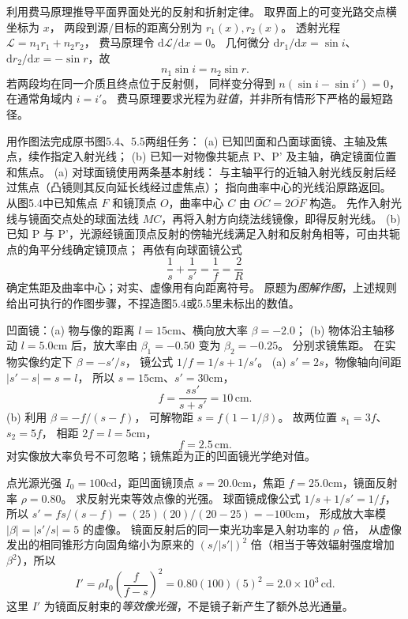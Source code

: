 利用费马原理推导平面界面处光的反射和折射定律。
\exsolution
取界面上的可变光路交点横坐标为 $x$，
两段到源/目标的距离分别为 $r_1(x),r_2(x)$。
透射光程
$\mathcal L=n_1r_1+n_2r_2$，
费马原理令
$\mathrm d\mathcal L/\mathrm dx=0$。
几何微分
$\mathrm dr_1/\mathrm dx=\sin i$、
$\mathrm dr_2/\mathrm dx=-\sin r$，故
\[
\boxed{n_1\sin i=n_2\sin r}.
\]
若两段均在同一介质且终点位于反射侧，
同样变分得到
$n(\sin i-\sin i')=0$，
在通常角域内
$\boxed{i=i'}$。
\excheck 费马原理要求光程为\emph{驻值}，并非所有情形下严格的最短路径。

用作图法完成原书图5.4、5.5两组任务：
(a) 已知凹面和凸面球面镜、主轴及焦点，续作指定入射光线；
(b) 已知一对物像共轭点 P、P' 及主轴，确定镜面位置和焦点。
\exsolution
(a) 对球面镜使用两条基本射线：
与主轴平行的近轴入射光线反射后经过焦点（凸镜则其反向延长线经过虚焦点）；
指向曲率中心的光线沿原路返回。
从图5.4中已知焦点 $F$ 和镜顶点 $O$，曲率中心 $C$ 由
$\overline{OC}=2\overline{OF}$ 构造。
先作入射光线与镜面交点处的球面法线 $MC$，再将入射方向绕法线镜像，即得反射光线。
(b) 已知 P 与 P'，光源经镜面顶点反射的傍轴光线满足入射和反射角相等，可由共轭点的角平分线确定镜顶点；
再依有向球面镜公式
\[
\boxed{\frac1s+\frac1{s'}=\frac1f=\frac2R}
\]
确定焦距及曲率中心；对实、虚像用有向距离符号。
\excheck 原题为\emph{图解作图}，上述规则给出可执行的作图步骤，不捏造图5.4或5.5里未标出的数值。

凹面镜：(a) 物与像的距离 $l=15$cm、横向放大率
$\beta=-2.0$；
(b) 物体沿主轴移动 $l=5.0$cm 后，放大率由
$\beta_1=-0.50$ 变为 $\beta_2=-0.25$。
分别求镜焦距。
\exsolution
在实物实像约定下
$\beta=-s'/s$，
镜公式 $1/f=1/s+1/s'$。
(a) $s'=2s$，物像轴向间距
$|s'-s|=s=l$，
所以 $s=15$cm、$s'=30$cm，
\[
\boxed{f=\frac{ss'}{s+s'}=10\,\mathrm{cm}}.
\]
(b) 利用
$\beta=-f/(s-f)$，
可解物距
$s=f(1-1/\beta)$。
故两位置
$s_1=3f$、$s_2=5f$，
相距 $2f=l=5$cm，
\[
\boxed{f=2.5\,\mathrm{cm}}.
\]
\excheck 对实像放大率负号不可忽略；镜焦距为正的凹面镜光学绝对值。

点光源光强 $I_0=100$cd，距凹面镜顶点
$s=20.0$cm，焦距 $f=25.0$cm，镜面反射率
$\rho=0.80$。
求反射光束等效点像的光强。
\exsolution
球面镜成像公式
$1/s+1/s'=1/f$，
所以
$s'=fs/(s-f)
=(25)(20)/(20-25)=-100$cm，
形成放大率模
$|\beta|=|s'/s|=5$ 的虚像。
镜面反射后的同一束光功率是入射功率的 $\rho$ 倍，
从虚像发出的相同锥形方向固角缩小为原来的
$(s/|s'|)^2$ 倍（相当于等效辐射强度增加 $\beta^2$），所以
\[
\boxed{I'=\rho I_0
\left(\frac{f}{f-s}\right)^2
=0.80(100)(5)^2
=2.0\times10^3\,\mathrm{cd}}.
\]
\excheck 这里 $I'$ 为镜面反射束的\emph{等效像光强}，不是镜子新产生了额外总光通量。

